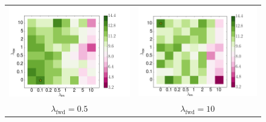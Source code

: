 \documentclass[11pt,a4paper]{article}
\begin{document}
\begin{figure}
\begin{tabular}{c c}
\includegraphics[scale=0.36]{wmt0_2.png} & \includegraphics[scale=0.36]{wmt5.png} \\
$\lambda_\text{fwd} = 0.5$ & $\lambda_\text{fwd} = 10$ \\

\end{tabular}
\end{figure}
\end{document}
